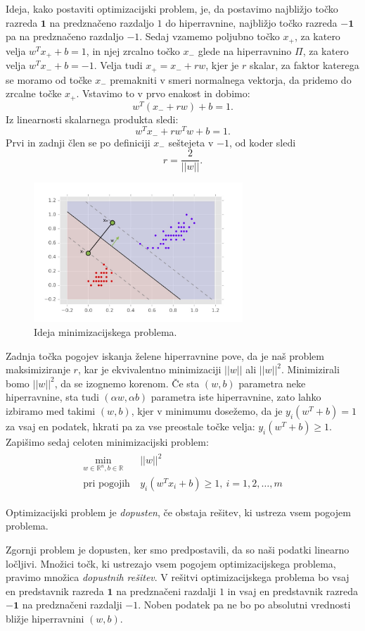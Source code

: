 \documentclass[mat1]{fmfdelo}
\newcommand{\R}{\mathbb R}
\newcommand{\pr}{\mathbf 1}
\newcommand{\nr}{\mathbf {-1}}
\begin{document}
Ideja, kako postaviti optimizacijski problem, je, da postavimo najbližjo točko razreda $\pr$ na predznačeno razdaljo $1$ do hiperravnine, najbližjo točko razreda $\nr$ pa na predznačeno razdaljo $-1$. Sedaj vzamemo poljubno točko $x_+$, za katero velja  $w^Tx_++ b = 1 $, in njej zrcalno točko $x_-$ glede na hiperravnino $\Pi$, za katero velja $w^Tx_-+ b = -1 $. Velja tudi $x_+ = x_- + r w$, kjer je $r$ skalar, za faktor katerega se moramo od točke $x_-$ premakniti v smeri normalnega vektorja, da pridemo do zrcalne točke $x_+$. Vstavimo to v prvo enakost in dobimo:
$$ w^T( x_- + r w)  + b = 1. $$
Iz linearnosti skalarnega produkta sledi: 
$$ w^Tx_-  + rw^Tw+ b = 1. $$
Prvi in zadnji člen se po definiciji $x_-$ seštejeta v $-1$, od koder sledi 
$$ r = \frac{2}{||w||}.$$
\begin{figure}[ht]
	\centering
	\includegraphics[width=0.7\textwidth]{slike/LinearnoLocljiviOptimizacija.jpg}
	\caption{Ideja minimizacijskega problema.}
	\label{slikaIdejaMinimizacijskegaProblema}
\end{figure}
Zadnja točka pogojev iskanja želene hiperravnine pove, da je naš problem maksimiziranje $r$, kar je ekvivalentno minimizaciji $||w||$ ali $||w||^2.$ Minimizirali bomo $||w||^2$, da se izognemo korenom. 
Če sta $(w, b)$ parametra neke hiperravnine, sta tudi $(\alpha w, \alpha b)$ parametra iste hiperravnine, zato lahko izbiramo med takimi $(w, b)$, kjer v minimumu dosežemo, da je $y_i(w^T+b) =1$ za vsaj en podatek, hkrati pa za vse preostale točke velja: $y_i(w^T+b) \ge 1.$
Zapišimo sedaj celoten minimizacijski problem: 
\begin{align}
\label{min_prvic}
\begin{split}
\min_{w \in \R^n, b \in \R}  &||w||^2  \\
\text{pri pogojih}~ &y_i(w^Tx_i + b)\ge 1,  ~ i= 1, 2, \ldots, m
\end{split}
\end{align}
\begin{definicija}
	Optimizacijski problem je \emph{dopusten}, če obstaja rešitev, ki ustreza vsem pogojem problema. 
\end{definicija}
Zgornji problem je dopusten, ker smo predpostavili, da so naši podatki linearno ločljivi. Množici točk, ki ustrezajo vsem pogojem optimizacijskega problema, pravimo množica \emph{dopustnih rešitev}. 
V rešitvi optimizacijskega problema bo vsaj en predstavnik razreda $\pr$ na predznačeni razdalji $1$ in vsaj en predstavnik razreda $\nr$ na predznačeni razdalji $-1$. Noben podatek pa ne bo po absolutni vrednosti bližje hiperravnini $(w, b)$.
\end{document}
